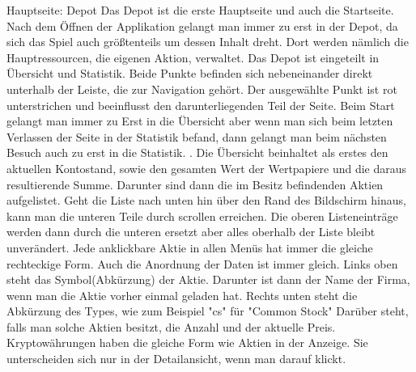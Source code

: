 \documentclass[10pt]{scrartcl}
\begin{document}
Hauptseite: Depot
Das Depot ist die erste Hauptseite und auch die Startseite. Nach dem Öffnen der Applikation gelangt man immer zu erst in der Depot, da sich das Spiel auch größtenteils um dessen Inhalt dreht. Dort werden nämlich die Hauptressourcen, die eigenen Aktion, verwaltet.
Das Depot ist eingeteilt in Übersicht und Statistik. Beide Punkte befinden sich nebeneinander direkt unterhalb der Leiste, die zur Navigation gehört. Der ausgewählte Punkt ist rot unterstrichen und beeinflusst den darunterliegenden Teil der Seite. Beim Start gelangt man immer zu Erst in die Übersicht aber wenn man sich beim letzten Verlassen der Seite in der Statistik befand, dann gelangt man beim nächsten Besuch auch zu erst in die Statistik. .
Die Übersicht beinhaltet als erstes den aktuellen Kontostand, sowie den gesamten Wert der Wertpapiere und die daraus resultierende Summe. Darunter sind dann die im Besitz befindenden Aktien aufgelistet. Geht die Liste nach unten hin über den Rand des Bildschirm hinaus, kann man die unteren Teile durch scrollen erreichen. Die oberen Listeneinträge werden dann durch die unteren ersetzt aber alles oberhalb der Liste bleibt unverändert.
Jede anklickbare Aktie in allen Menüs hat immer die gleiche rechteckige Form. Auch die Anordnung der Daten ist immer gleich. Links oben steht das Symbol(Abkürzung) der Aktie. Darunter ist dann der Name der Firma, wenn man die Aktie vorher einmal geladen hat. Rechts unten steht die Abkürzung des Types, wie zum Beispiel "cs" für "Common Stock" Darüber steht, falls man solche Aktien besitzt, die Anzahl und der aktuelle Preis.
Kryptowährungen haben die gleiche Form wie Aktien in der Anzeige. Sie unterscheiden sich nur in der Detailansicht, wenn man darauf klickt.
\end{document}
